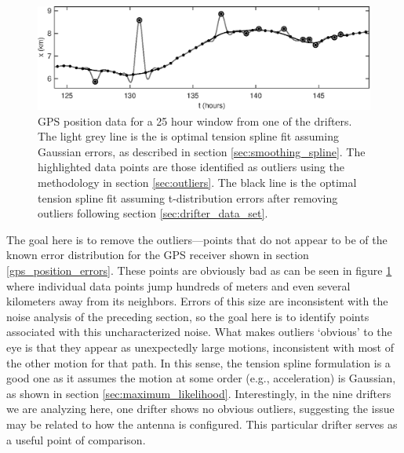 \documentclass[10pt,journal]{IEEEtran}
\begin{document}
\begin{figure}[t]
  \centerline{\includegraphics[width=39pc,angle=0]{figures/gpsfit}}
  
  \caption{GPS position data for a 25 hour window from one of the drifters. The light grey line is the is optimal tension spline fit assuming Gaussian errors, as described in section \ref{sec:smoothing_spline}. The highlighted data points are those identified as outliers using the methodology in section \ref{sec:outliers}. The black line is the optimal tension spline fit assuming t-distribution errors after removing outliers following section \ref{sec:drifter_data_set}.}
  \label{gpsfit}
\end{figure}

The goal here is to remove the outliers---points that do not appear to be of the known error distribution for the GPS receiver shown in section \ref{gps_position_errors}. These points are obviously bad as can be seen in figure \ref{gpsfit} where individual data points jump hundreds of meters and even several kilometers away from its neighbors. Errors of this size are inconsistent with the noise analysis of the preceding section, so the goal here is to identify points associated with this uncharacterized noise. What makes outliers `obvious' to the eye is that they appear as unexpectedly large motions, inconsistent with most of the other motion for that path. In this sense, the tension spline formulation is a good one as it assumes the motion at some order (e.g., acceleration) is Gaussian, as shown in section \ref{sec:maximum_likelihood}. Interestingly, in the nine drifters we are analyzing here, one drifter shows no obvious outliers, suggesting the issue may be related to how the antenna is configured. This particular drifter serves as a useful point of comparison.
\end{document}
